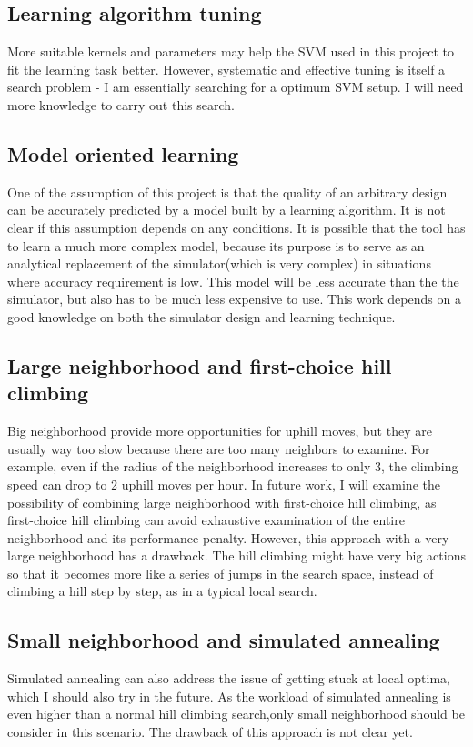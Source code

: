 \documentclass[12pt]{article}
\theoremstyle{definition}
\begin{document}
\subsection{Learning algorithm tuning}
More suitable kernels and parameters may help the SVM used in this project to fit the learning task better. However, systematic and effective tuning is itself a search problem - I am essentially searching for a optimum SVM setup. I will need more knowledge to carry out this search.
\subsection{Model oriented learning}
One of the assumption of this project is that the quality of an arbitrary design can be accurately predicted by a model built by a learning algorithm. It is not clear if this assumption depends on any conditions. It is possible that the tool has to learn a much more complex model, because its purpose is to serve as an analytical replacement of the simulator(which is very complex) in situations where accuracy requirement is low. This model will be less accurate than the the simulator, but also has to be much less expensive to use. This work depends on a good knowledge on both the simulator design and learning technique.
\subsection{Large neighborhood and first-choice hill climbing}
Big neighborhood provide more opportunities for uphill moves, but they are usually way too slow because there are too many neighbors to examine. For example, even if the radius of the neighborhood increases to only 3, the climbing speed can drop to 2 uphill moves per hour. In future work, I will examine the possibility of combining large neighborhood with first-choice hill climbing, as first-choice hill climbing can avoid exhaustive examination of the entire neighborhood and its performance penalty. However, this approach with a very large neighborhood has a drawback. The hill climbing might have very big actions so that it becomes more like a series of jumps in the search space, instead of climbing a hill step by step, as in a typical local search.
\subsection{Small neighborhood and simulated annealing}
Simulated annealing can also address the issue of getting stuck at local optima, which I should also try in the future. As the workload of simulated annealing is even higher than a normal hill climbing search,only small neighborhood should be consider in this scenario. The drawback of this approach is not clear yet.
\end{document}
